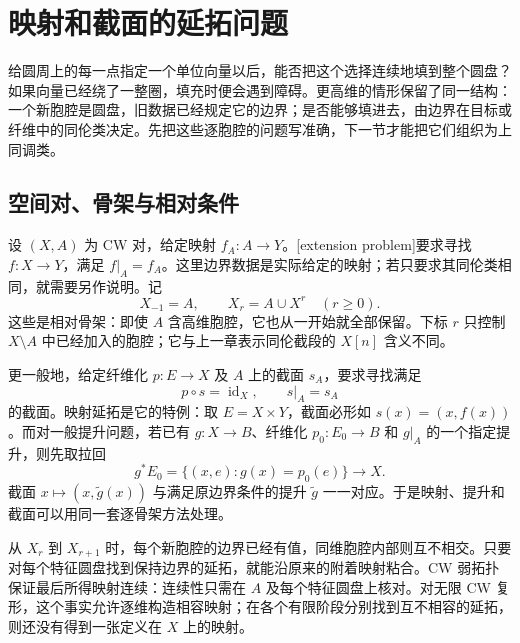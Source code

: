 
% 
% 

\section{映射和截面的延拓问题}
\label{g2:sec:1201}

给圆周上的每一点指定一个单位向量以后，能否把这个选择连续地填到整个圆盘？如果向量已经绕了一整圈，填充时便会遇到障碍。更高维的情形保留了同一结构：一个新胞腔是圆盘，旧数据已经规定它的边界；是否能够填进去，由边界在目标或纤维中的同伦类决定。先把这些逐胞腔的问题写准确，下一节才能把它们组织为上同调类。

\subsection{空间对、骨架与相对条件}
\label{g2:subsec:1201:01}

设 \((X,A)\) 为 CW 对，给定映射 \(f_A:A\to Y\)。[extension problem]要求寻找 \(f:X\to Y\)，满足 \(f|_A=f_A\)。这里边界数据是实际给定的映射；若只要求其同伦类相同，就需要另作说明。记
\begin{equation}\label{g2:eq:relative-obstruction-skeleta}
	X_{-1}=A,\qquad X_r=A\cup X^r\quad(r\ge0).
\end{equation}
这些是相对骨架：即使 \(A\) 含高维胞腔，它也从一开始就全部保留。下标 \(r\) 只控制 \(X\setminus A\) 中已经加入的胞腔；它与上一章表示同伦截段的 \(X[n]\) 含义不同。

\ProseParagraphBreak

更一般地，给定纤维化 \(p:E\to X\) 及 \(A\) 上的截面 \(s_A\)，要求寻找满足
\[
	p\circ s=\operatorname{id}_X,\qquad s|_A=s_A
\]
的截面。映射延拓是它的特例：取 \(E=X\times Y\)，截面必形如 \(s(x)=(x,f(x))\)。而对一般提升问题，若已有 \(g:X\to B\)、纤维化 \(p_0:E_0\to B\) 和 \(g|_A\) 的一个指定提升，则先取拉回
\[
	g^*E_0=\{(x,e):g(x)=p_0(e)\}\longrightarrow X.
\]
截面 \(x\mapsto(x,\widetilde g(x))\) 与满足原边界条件的提升 \(\widetilde g\) 一一对应。于是映射、提升和截面可以用同一套逐骨架方法处理。

\ProseParagraphBreak

从 \(X_r\) 到 \(X_{r+1}\) 时，每个新胞腔的边界已经有值，同维胞腔内部则互不相交。只要对每个特征圆盘找到保持边界的延拓，就能沿原来的附着映射粘合。CW 弱拓扑保证最后所得映射连续：连续性只需在 \(A\) 及每个特征圆盘上核对。对无限 CW 复形，这个事实允许逐维构造相容映射；在各个有限阶段分别找到互不相容的延拓，则还没有得到一张定义在 \(X\) 上的映射。

